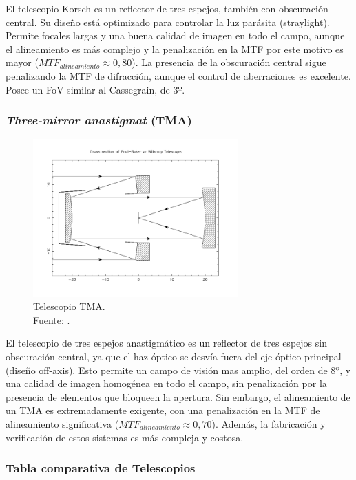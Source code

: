 El telescopio Korsch es un reflector de tres espejos, también con obscuración central. Su diseño está optimizado para controlar la luz parásita (straylight). Permite focales largas y una buena calidad de imagen en todo el campo, aunque el alineamiento es más complejo y la penalización en la MTF por este motivo es mayor ($MTF_{alineamiento} \approx 0,80$). La presencia de la obscuración central sigue penalizando la MTF de difracción, aunque el control de aberraciones es excelente. Posee un FoV similar al Cassegrain, de $3º$.

\subsubsection{\textit{Three-mirror anastigmat} (TMA)}

\begin{figure}[H]
    \centering
    \includegraphics[width=0.7\textwidth]{3.Conceptos_Previos/TMA.png}
    \caption{Telescopio TMA. \\Fuente: \cite{tma_telescope_diagram}.}
    \label{fig:Tma}
\end{figure}

El telescopio de tres espejos anastigmático es un reflector de tres espejos sin obscuración central, ya que el haz óptico se desvía fuera del eje óptico principal (diseño off-axis). Esto permite un campo de visión mas amplio, del orden de $8º$, y una calidad de imagen homogénea en todo el campo, sin penalización por la presencia de elementos que bloqueen la apertura. Sin embargo, el alineamiento de un TMA es extremadamente exigente, con una penalización en la MTF de alineamiento significativa ($MTF_{alineamiento} \approx 0,70$). Además, la fabricación y verificación de estos sistemas es más compleja y costosa.

\subsubsection*{Tabla comparativa de Telescopios}

